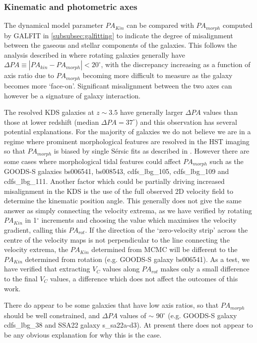 \documentclass[fleqn,usenatbib]{mn2e}
\newcommand{\Sers}{S\'{e}rsic }
\begin{document}
\subsubsection{Kinematic and photometric axes}\label{subsubsection:kin_and_phot}

The dynamical model parameter $PA_{Kin}$ can be compared with $PA_{morph}$ computed by GALFIT in \cref{subsubsec:galfitting} to indicate the degree of misalignment between the gaseous and stellar components of the galaxies.
This follows the analysis described in \citep[e.g.][]{Epinat2008,Epinat2012,Barrera-Ballesteros2014,Barrera-Ballesteros2015,Wisnioski2015,Harrison2017} where rotating galaxies generally have $\Delta PA \equiv |PA_{kin}-PA_{morph}| < 20^{\circ}$, with the discrepancy increasing as a function of axis ratio due to $PA_{morph}$ becoming more difficult to measure as the galaxy becomes more `face-on'.
Significant misalignment between the two axes can however be a signature of galaxy interaction.

The resolved KDS galaxies at $z \sim 3.5$ have generally larger $\Delta PA$ values than those at lower redshift (median $\Delta PA = 37^{\circ}$) and this observation has several potential explanations.
For the majority of galaxies we do not believe we are in a regime where prominent morphological features are resolved in the HST imaging so that $PA_{morph}$ is biased by single \Sers fits as described in \cite{Rodrigues2016}.
However there are some cases where morphological tidal features could affect $PA_{morph}$ such as the GOODS-S galaxies bs006541, bs008543, cdfs\_lbg\_105, cdfs\_lbg\_109 and cdfs\_lbg\_111.
Another factor which could be partially driving increased misalignment in the KDS is the use of the full observed 2D velocity field to determine the kinematic position angle.
This generally does not give the same answer as simply connecting the velocity extrema, as we have verified by rotating $PA_{Kin}$ in 1$^{\circ}$ increments and choosing the value which maximises the velocity gradient, calling this $PA_{rot}$.
If the direction of the `zero-velocity strip' across the centre of the velocity maps is not perpendicular to the line connecting the velocity extrema, the $PA_{Kin}$ determined from MCMC will be different to the $PA_{Kin}$ determined from rotation (e.g. GOODS-S galaxy bs006541).
As a test, we have verified that extracting $V_{C}$ values along $PA_{rot}$ makes only a small difference to the final $V_{C}$ values, a difference which does not affect the outcomes of this work.

There do appear to be some galaxies that have low axis ratios, so that $PA_{morph}$ should be well constrained, and $\Delta PA$ values of $\sim$ 90$^{\circ}$ (e.g. GOODS-S galaxy cdfs\_lbg\_38 and SSA22 galaxy s\_sa22a-d3).
At present there does not appear to be any obvious explanation for why this is the case.
\end{document}
